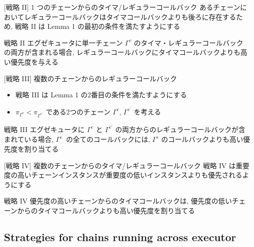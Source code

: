 \begin{frame}[label=strategy2]{[戦略 II] 1 つのチェーンからのタイマ/レギュラーコールバック}
    あるチェーンにおいてレギュラーコールバックはタイマコールバックよりも後ろに存在するため, 戦略 II は Lemma 1 の最初の条件を満たすようにする
    \begin{block}{戦略 II}
        エグゼキュータに単一チェーン $\Gamma^{c}$ のタイマ・レギュラーコールバックの両方が含まれる場合, レギュラーコールバックにタイマコールバックよりも高い優先度を与える
    \end{block}
\end{frame}

\begin{frame}[label=strategy3]{[戦略 III] 複数のチェーンからのレギュラーコールバック}
    \begin{itemize}
        \item 戦略 III は Lemma 1 の2番目の条件を満たすようにする
        \item $\pi_{\Gamma^{c}}<\pi_{\Gamma^{c^{\prime}}}$ である2つのチェーン $\Gamma^{c}$, $\Gamma^{c^{\prime}}$ を考える
    \end{itemize}
    \begin{block}{戦略 III}
        エグゼキュータに $\Gamma^{c}$ と $\Gamma^{c^{\prime}}$ の両方からのレギュラーコールバックが含まれている場合, $\Gamma^{c^{\prime}}$ の全てのコールバックには, $\Gamma^{c}$ のコールバックよりも高い優先度を割り当てる
    \end{block}
\end{frame}

\begin{frame}[label=strategy4]{[戦略 IV] 複数のチェーンからのタイマ/レギュラーコールバック}
    戦略 IV は重要度の高いチェーンインスタンスが重要度の低いインスタンスよりも優先されるようにする
    \begin{block}{戦略 IV}
        優先度の高いチェーンからのタイマコールバックは, 優先度の低いチェーンからのタイマコールバックよりも高い優先度を割り当てる
    \end{block}
\end{frame}


\subsection{Strategies for chains running across executor}
\label{ssec: strategies for chains running across executor}


